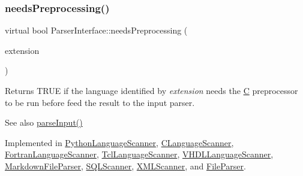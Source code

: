 \subsubsection{\texorpdfstring{needsPreprocessing()}{needsPreprocessing()}}
{\footnotesize\ttfamily virtual bool Parser\+Interface\+::needs\+Preprocessing (\begin{DoxyParamCaption}\item[{const \mbox{\hyperlink{class_q_c_string}{Q\+C\+String}} \&}]{extension }\end{DoxyParamCaption})\hspace{0.3cm}{\ttfamily [pure virtual]}}

Returns T\+R\+UE if the language identified by {\itshape extension} needs the \mbox{\hyperlink{class_c}{C}} preprocessor to be run before feed the result to the input parser. \begin{DoxySeeAlso}{See also}
\mbox{\hyperlink{class_parser_interface_a09ced377e619d40b7339187bad88341e}{parse\+Input()}} 
\end{DoxySeeAlso}


Implemented in \mbox{\hyperlink{class_python_language_scanner_a7c6ce0a95e477374182374a9f5bb2e2f}{Python\+Language\+Scanner}}, \mbox{\hyperlink{class_c_language_scanner_a88315d1d6591098e284bd2b91d4ba233}{C\+Language\+Scanner}}, \mbox{\hyperlink{class_fortran_language_scanner_a94620ec6b6cf583dccd2544671e9e578}{Fortran\+Language\+Scanner}}, \mbox{\hyperlink{class_tcl_language_scanner_ab3a4ec9c04dbcf8bb75cd1552c774f5e}{Tcl\+Language\+Scanner}}, \mbox{\hyperlink{class_v_h_d_l_language_scanner_ae36ed4aad0a9dc9beed5afa3e831a5ee}{V\+H\+D\+L\+Language\+Scanner}}, \mbox{\hyperlink{class_markdown_file_parser_ae53b811156b426b03f4ea8f634141133}{Markdown\+File\+Parser}}, \mbox{\hyperlink{class_s_q_l_scanner_a601b62fbb52bd81bbeb991ec2540915d}{S\+Q\+L\+Scanner}}, \mbox{\hyperlink{class_x_m_l_scanner_aee7d6327a9e55cd3b965a21f707ed0a5}{X\+M\+L\+Scanner}}, and \mbox{\hyperlink{class_file_parser_acf9bb5f92915a547a6638a07e63b9100}{File\+Parser}}.

\mbox{\label{class_parser_interface_a2ffc28f9dd7c47e2581376a573426395}} 
